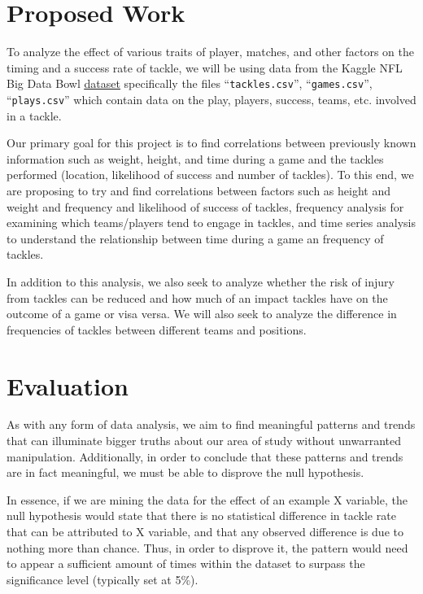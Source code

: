 \documentclass[sigconf, hyperref={colorlinks=true,linkcolor=blue,urlcolor=blue}]{acmart}
\begin{document}
\section{Proposed Work}

To analyze the effect of various traits of player, matches, and other factors on
the timing and a success rate of tackle, we will be using data from the Kaggle
NFL Big Data Bowl
\href{https://www.kaggle.com/competitions/nfl-big-data-bowl-2024/data}{\underline{dataset}}
specifically the files ``\verb|tackles.csv|'', ``\verb|games.csv|'',
``\verb|plays.csv|'' which contain data on the play, players, success, teams,
etc. involved in a tackle.

Our primary goal for this project is to find correlations between previously
known information such as weight, height, and time during a game and the tackles
performed (location, likelihood of success and number of tackles). To this end,
we are proposing to try and find correlations between factors such as height and
weight and frequency and likelihood of success of tackles, frequency analysis
for examining which teams/players tend to engage in tackles, and time series
analysis to understand the relationship between time during a game an frequency
of tackles.

In addition to this analysis, we also seek to analyze whether the risk of injury
from tackles can be reduced and how much of an impact tackles have on the
outcome of a game or visa versa. We will also seek to analyze the difference in
frequencies of tackles between different teams and positions.

\section{Evaluation}

As with any form of data analysis, we aim to find meaningful patterns and trends
that can illuminate bigger truths about our area of study without unwarranted
manipulation. Additionally, in order to conclude that these patterns and trends are
in fact meaningful, we must be able to disprove the null hypothesis.

In essence, if we are mining the data for the effect of an example X variable, the null
hypothesis would state that there is no statistical difference in tackle rate that can be
attributed to X variable, and that any observed difference is due to nothing more than chance.
Thus, in order to disprove it, the pattern would need to appear a sufficient amount of times
within the dataset to surpass the significance level (typically set at 5\%).
\end{document}
